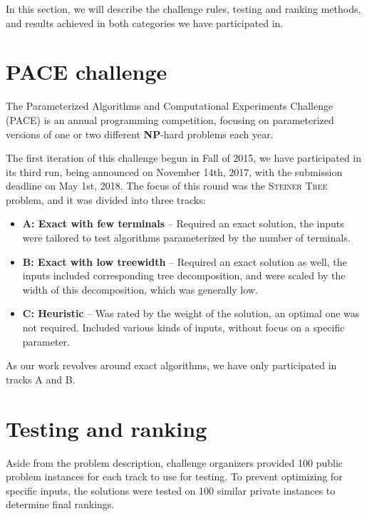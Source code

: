 \documentclass[thesis=M,english,hidelinks]{FITthesis}[2012/10/20]
\theoremstyle{definition}
\newcommand{\NPH}{\textbf{NP}-hard\xspace}
\begin{document}
In this section, we will describe the challenge rules, testing and ranking methods, and results achieved in both
categories we have participated in.

\section{PACE challenge}

The Parameterized Algorithms and Computational Experiments Challenge (PACE) \cite{PaceWeb} is an annual programming
competition, focusing on parameterized versions of one or two different \NPH problems each year.

The first iteration of this challenge begun in Fall of 2015, we have participated in its third run, being announced on
November 14th, 2017, with the submission deadline on May 1st, 2018. The focus of this round was the \textsc{Steiner
Tree} problem, and it was divided into three tracks:

\begin{itemize}
    \item \textbf{A: Exact with few terminals} -- Required an exact solution, the inputs were tailored to test algorithms
        parameterized by the number of terminals.

    \item \textbf{B: Exact with low treewidth} -- Required an exact solution as well, the inputs included corresponding
        tree decomposition, and were scaled by the width of this decomposition, which was generally low.

    \item \textbf{C: Heuristic} -- Was rated by the weight of the solution, an optimal one was not required. Included
        various kinds of inputs, without focus on a specific parameter.
\end{itemize}

As our work revolves around exact algorithms, we have only participated in tracks A and B.

\section{Testing and ranking}
\label{sec:pacetest}

Aside from the problem description, challenge organizers provided 100 public problem instances for each track to use
for testing. To prevent optimizing for specific inputs, the solutions were tested on 100 similar private instances to
determine final rankings.
\end{document}
